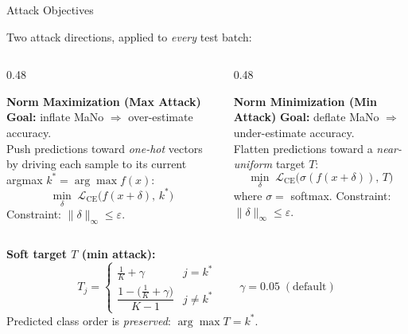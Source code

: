 \documentclass[aspectratio=169]{beamer}
\newcommand{\CE}{\mathcal{L}_{\mathrm{CE}}}
\newcommand{\kstar}{k^{*}}
\begin{document}
\begin{frame}{Attack Objectives}

Two attack directions, applied to \emph{every} test batch:

\bigskip
\begin{columns}[T]
\begin{column}{0.48\textwidth}
  \begin{block}{\textcolor{maxcolor}{\textbf{Norm Maximization (Max Attack)}}}
    \textbf{Goal:} inflate MaNo $\Rightarrow$ over-estimate accuracy.\\[6pt]
    Push predictions toward \emph{one-hot} vectors by driving each
    sample to its current argmax $\kstar = \arg\max f(x)$:
    \[
      \min_{\delta}\; \CE\!\bigl(f(x+\delta),\, \kstar\bigr)
    \]
    Constraint: $\|\delta\|_\infty \le \varepsilon$.
  \end{block}
\end{column}
\hfill
\begin{column}{0.48\textwidth}
  \begin{block}{\textcolor{mincolor}{\textbf{Norm Minimization (Min Attack)}}}
    \textbf{Goal:} deflate MaNo $\Rightarrow$ under-estimate accuracy.\\[6pt]
    Flatten predictions toward a \emph{near-uniform} target $T$:
    \[
      \min_{\delta}\; \CE\!\bigl(\sigma(f(x+\delta)),\, T\bigr)
    \]
    where $\sigma = $ softmax. Constraint: $\|\delta\|_\infty \le \varepsilon$.
  \end{block}
\end{column}
\end{columns}

\bigskip
\textbf{Soft target $T$ (min attack):}
\[
  T_j =
  \begin{cases}
    \tfrac{1}{K} + \gamma & j = \kstar \\[2pt]
    \dfrac{1 - \bigl(\tfrac{1}{K}+\gamma\bigr)}{K-1} & j \ne \kstar
  \end{cases}
  \qquad \gamma = 0.05 \;(\text{default})
\]
Predicted class order is \emph{preserved}: $\arg\max T = \kstar$.

\end{frame}
\end{document}
